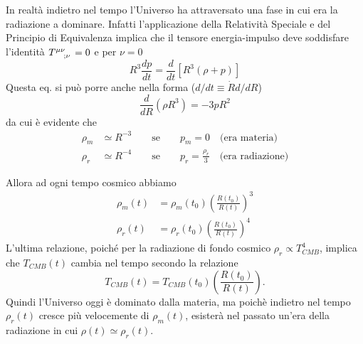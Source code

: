 In realtà indietro nel tempo l'Universo ha attraversato una fase in cui era la
radiazione a dominare.  Infatti l'applicazione della Relatività Speciale e del
Principio di Equivalenza implica che il tensore energia-impulso deve soddisfare
l'identità $\tensor{T}{^{\mu \nu}_{;\nu}}=0$ e per
$\nu=0$~\parencite[414]{weinberg:gravitation}
\begin{equation}
  R^3 \frac{dp}{dt} = \frac{d}{dt} \left[R^3 \left( \rho +p \right) \right]
\end{equation}
Questa eq. si può porre anche nella forma ($d/dt \equiv {\dot R} d/dR$)
\begin{equation}
  \frac{d}{dR} \left( \rho R^3 \right)  = -3pR^2
  \label{eq_cons}
\end{equation}
da cui è evidente che
\begin{subequations}
  \begin{align}
    \rho_m  & \simeq R^{-3} \qquad\text{se}\qquad p_m=0 \quad\text{(era
              materia)} \\
    \rho_r  & \simeq R^{-4} \qquad\text{se}\qquad p_r=\frac{\rho_r}{3}
              \quad\text{(era radiazione)}
  \end{align}
\end{subequations}

Allora ad ogni tempo cosmico abbiamo
\begin{subequations}
  \begin{align}
    \rho_m (t) &= \rho_m(t_0) \left( \frac {R(t_0)} {R(t)} \right)^3  \\
    \rho_r (t) &= \rho_r(t_0) \left( \frac {R(t_0)} {R(t)} \right)^4
  \end{align}
\end{subequations}
L'ultima relazione, poiché per la radiazione di fondo cosmico $\rho_r \propto
T^4_{CMB}$, implica che $T_{CMB}(t)$ cambia nel tempo secondo la relazione
\begin{equation}
  T_{CMB}(t) = T_{CMB}(t_0) \left( \frac {R(t_0)} {R(t)} \right).
\end{equation}
Quindi l'Universo oggi è dominato dalla materia, ma poichè indietro nel tempo
$\rho_r(t)$ cresce più velocemente di $\rho_m(t)$, esisterà nel passato un'era
della radiazione in cui $\rho(t) \simeq \rho_r(t)$.

